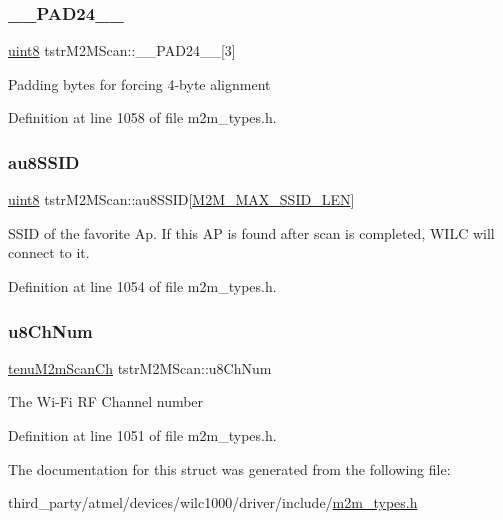 \subsubsection{\texorpdfstring{\+\_\+\+\_\+\+P\+A\+D24\+\_\+\+\_\+}{\_\_PAD24\_\_}}
{\footnotesize\ttfamily \hyperlink{group__DataT_ga4df709a77647e870bbf1d955b8edc9a6}{uint8} tstr\+M2\+M\+Scan\+::\+\_\+\+\_\+\+P\+A\+D24\+\_\+\+\_\+\mbox{[}3\mbox{]}}

Padding bytes for forcing 4-\/byte alignment 

Definition at line 1058 of file m2m\+\_\+types.\+h.

\mbox{\label{structtstrM2MScan_a102e537d738c9634a7a8fb04b7aaa0b6}} 
\subsubsection{\texorpdfstring{au8\+S\+S\+ID}{au8SSID}}
{\footnotesize\ttfamily \hyperlink{group__DataT_ga4df709a77647e870bbf1d955b8edc9a6}{uint8} tstr\+M2\+M\+Scan\+::au8\+S\+S\+ID\mbox{[}\hyperlink{group__WlanDefines_gab2bd95c18ede2fbc07b44c5660cc0097}{M2\+M\+\_\+\+M\+A\+X\+\_\+\+S\+S\+I\+D\+\_\+\+L\+EN}\mbox{]}}

S\+S\+ID of the favorite Ap. If this AP is found after scan is completed, W\+I\+LC will connect to it. 

Definition at line 1054 of file m2m\+\_\+types.\+h.

\mbox{\label{structtstrM2MScan_a6157d51ded3a7c8aee449fa0ef11c6a9}} 
\subsubsection{\texorpdfstring{u8\+Ch\+Num}{u8ChNum}}
{\footnotesize\ttfamily \hyperlink{group__WlanEnums_ga2a91dd671e2672dba1a7ed45230f3a99}{tenu\+M2m\+Scan\+Ch} tstr\+M2\+M\+Scan\+::u8\+Ch\+Num}

The Wi-\/\+Fi RF Channel number 

Definition at line 1051 of file m2m\+\_\+types.\+h.



The documentation for this struct was generated from the following file\+:\begin{DoxyCompactItemize}
\item 
third\+\_\+party/atmel/devices/wilc1000/driver/include/\hyperlink{m2m__types_8h}{m2m\+\_\+types.\+h}\end{DoxyCompactItemize}

